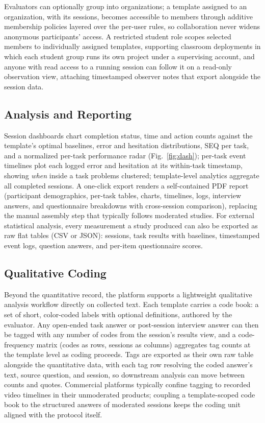 \documentclass[conference]{IEEEtran}
\begin{document}
Evaluators can optionally group into organizations; a template assigned
to an organization, with its sessions, becomes accessible to members
through additive membership policies layered over the per-user rules,
so collaboration never widens anonymous participants' access. A
restricted student role scopes selected members to individually
assigned templates, supporting classroom deployments in which each
student group runs its own project under a supervising account, and
anyone with read access to a running session can follow it on a
read-only observation view, attaching timestamped observer notes that
export alongside the session data.

\subsection{Analysis and Reporting}
Session dashboards chart completion status, time and action counts against
the template's optimal baselines, error and hesitation distributions, SEQ
per task, and a normalized per-task performance radar
(Fig.~\ref{fig:dash}); per-task event timelines plot each logged error
and hesitation at its within-task timestamp, showing \emph{when} inside a
task problems clustered; template-level analytics aggregate all completed
sessions. A one-click export renders a self-contained PDF report
(participant demographics, per-task tables, charts, timelines, logs,
interview answers, and questionnaire breakdowns with cross-session
comparison), replacing the manual assembly step that typically follows
moderated studies. For external statistical analysis, every measurement a
study produced can also be exported as raw flat tables (CSV or JSON):
sessions, task results with baselines, timestamped event logs, question
answers, and per-item questionnaire scores.

\subsection{Qualitative Coding}
Beyond the quantitative record, the platform supports a lightweight
qualitative analysis workflow directly on collected text. Each template
carries a code book: a set of short, color-coded labels with optional
definitions, authored by the evaluator. Any open-ended task answer or
post-session interview answer can then be tagged with any number of
codes from the session's results view, and a code-frequency matrix
(codes as rows, sessions as columns) aggregates tag counts at the
template level as coding proceeds. Tags are exported as their own raw
table alongside the quantitative data, with each tag row resolving the
coded answer's text, source question, and session, so downstream
analysis can move between counts and quotes. Commercial platforms
typically confine tagging to recorded video timelines in their
unmoderated products; coupling a template-scoped code book to the
structured answers of moderated sessions keeps the coding unit aligned
with the protocol itself.
\end{document}
